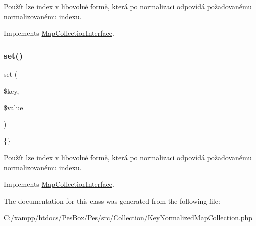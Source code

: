 Použít lze index v libovolné formě, která po normalizaci odpovídá požadovanému normalizovanému indexu. 

Implements \mbox{\hyperlink{interface_pes_1_1_collection_1_1_map_collection_interface}{Map\+Collection\+Interface}}.

\mbox{\label{class_pes_1_1_collection_1_1_key_normalized_map_collection_aab787bd83f84f4215dceb35f7c305eee}} 
\subsubsection{\texorpdfstring{set()}{set()}}
{\footnotesize\ttfamily set (\begin{DoxyParamCaption}\item[{}]{\$key,  }\item[{}]{\$value }\end{DoxyParamCaption})}

\{\}

Použít lze index v libovolné formě, která po normalizaci odpovídá požadovanému normalizovanému indexu. 

Implements \mbox{\hyperlink{interface_pes_1_1_collection_1_1_map_collection_interface}{Map\+Collection\+Interface}}.



The documentation for this class was generated from the following file\+:\begin{DoxyCompactItemize}
\item 
C\+:/xampp/htdocs/\+Pes\+Box/\+Pes/src/\+Collection/Key\+Normalized\+Map\+Collection.\+php\end{DoxyCompactItemize}
